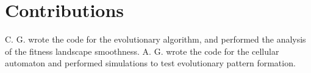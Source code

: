 \documentclass[twocolumn]{article}
\begin{document}
\section{Contributions}

C. G. wrote the code for the evolutionary algorithm, and performed the analysis of the fitness landscape smoothness. A. G. wrote the code for the cellular automaton and performed simulations to test evolutionary pattern formation.  




\end{document}

